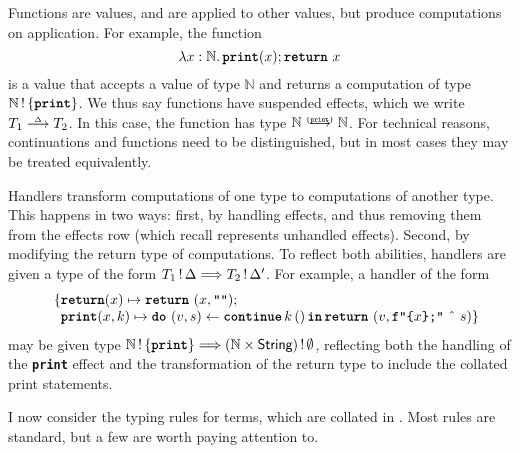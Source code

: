 Functions are values, and are applied to other values, but produce computations on application. For example, the function 
\[
\function{x:\mathbb{N}}{\, \textbf{\texttt{print}}(x); \return{x}}
\]
is a value that accepts a value of type $\mathbb{N}$ and returns a computation of type $\effectType[\{\textbf{\texttt{print}} \}]{\mathbb{N}}$. We thus say functions have suspended effects, which we write $\functionType{T_1}{T_2}$. In this case, the function has type $\functionType[\{ \textbf{\texttt{print}} \}]{\mathbb{N}}{\mathbb{N}}$. For technical reasons, continuations and functions need to be distinguished, but in most cases they may be treated equivalently. 

Handlers transform computations of one type to computations of another type. This happens in two ways: first, by handling effects, and thus removing them from the effects row (which recall represents unhandled effects). Second, by modifying the return type of computations. To reflect both abilities, handlers are given a type of the form $\handlerType{\effectType{T_1}}{\effectType[\Delta']{T_2}}$. For example, a handler of the form  
\[ \begin{array}{ll}
  \quad \{ \textbf{\texttt{return}}(x) \mapsto {\return{(x, \texttt{""})}}; \\
    \quad \, \,\, \textbf{\texttt{print}}(x, k) \mapsto {\bind{(v, s)}{\continue{k}{()}}{\return{(v, \texttt{f"\{$x$\};"} \text{ \^\ } s)}}}\}
  \end{array}
\]
may be given type $\handlerType{\effectType[\{ \textbf{\texttt{print}} \}]{\mathbb{N}}}{\effectType[\emptyset]{(\mathbb{N} \times \textsf{String})}}$, reflecting both the handling of the \textbf{\texttt{print}} effect and the transformation of the return type to include the collated print statements.

I now consider the typing rules for terms, which are collated in . Most rules are standard, but a few are worth paying attention to. 

